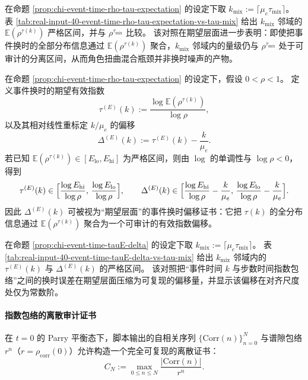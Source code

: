 \begin{remark}
\label{cor:chi-event-time-rho-tau-expectation-vs-tau-mix}
在命题 \ref{prop:chi-event-time-rho-tau-expectation} 的设定下取 $k_{\mathrm{mix}}:=\lceil\mu_e\tau_{\mathrm{mix}}\rceil$。
表 \ref{tab:real-input-40-event-time-rho-tau-expectation-vs-tau-mix} 给出 $k_{\mathrm{mix}}$ 邻域的 $\mathbb{E}(\rho^{\tau(k)})$ 严格区间，并与 $\rho^{\tau_{\mathrm{mix}}}$ 比较。
该对照在期望层面进一步表明：即使把事件换时的全部分布信息通过 $\mathbb{E}(\rho^{\tau(k)})$ 聚合，$k_{\mathrm{mix}}$ 邻域内的量级仍与 $\rho^{\tau_{\mathrm{mix}}}$ 处于可审计的分离区间，从而角色扭曲混合瓶颈并非换时噪声的产物。
\end{remark}



\begin{remark}
\label{prop:chi-event-time-tauE-delta}
在命题 \ref{prop:chi-event-time-rho-tau-expectation} 的设定下，假设 $0<\rho<1$。
定义事件换时的期望有效指数
$$
\tau^{(E)}(k):=\frac{\log\mathbb{E}(\rho^{\tau(k)})}{\log\rho},
$$
以及其相对线性重标定 $k/\mu_e$ 的偏移
$$
\Delta^{(E)}(k):=\tau^{(E)}(k)-\frac{k}{\mu_e}.
$$
若已知 $\mathbb{E}(\rho^{\tau(k)})\in[E_{\mathrm{lo}},E_{\mathrm{hi}}]$ 为严格区间，则由 $\log$ 的单调性与 $\log\rho<0$，得到
$$
\tau^{(E)}(k)\in\Bigl[\frac{\log E_{\mathrm{hi}}}{\log\rho},\,\frac{\log E_{\mathrm{lo}}}{\log\rho}\Bigr],
\qquad
\Delta^{(E)}(k)\in\Bigl[\frac{\log E_{\mathrm{hi}}}{\log\rho}-\frac{k}{\mu_e},\,\frac{\log E_{\mathrm{lo}}}{\log\rho}-\frac{k}{\mu_e}\Bigr].
$$
因此 $\Delta^{(E)}(k)$ 可被视为“期望层面”的事件换时偏移证书：它把 $\tau(k)$ 的全分布信息通过 $\mathbb{E}(\rho^{\tau(k)})$ 聚合为一个可审计的有效指数偏移。
\end{remark}

\begin{remark}
\label{cor:chi-event-time-tauE-delta-vs-tau-mix}
在命题 \ref{prop:chi-event-time-tauE-delta} 的设定下取 $k_{\mathrm{mix}}:=\lceil\mu_e\tau_{\mathrm{mix}}\rceil$。
表 \ref{tab:real-input-40-event-time-tauE-delta-vs-tau-mix} 给出 $k_{\mathrm{mix}}$ 邻域内的 $\tau^{(E)}(k)$ 与 $\Delta^{(E)}(k)$ 的严格区间。
该对照把“事件时间 $k$ 与步数时间指数包络”之间的换时误差在期望层面压缩为可复现的偏移量，并显示该偏移在对齐尺度处仅为常数阶。
\end{remark}



\paragraph{指数包络的离散审计证书}
在 $t=0$ 的 Parry 平衡态下，脚本输出的自相关序列 $\{\mathrm{Corr}(n)\}_{n=0}^N$ 与谱隙包络 $r^n$（$r=\rho_{\mathrm{corr}}(0)$）允许构造一个完全可复现的离散证书：
\[
C_N:=\max_{0\le n\le N}\frac{|\mathrm{Corr}(n)|}{r^n}.
\]
